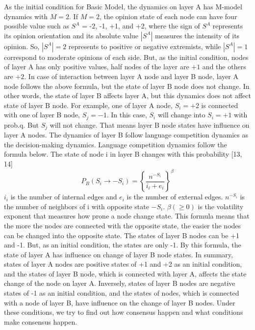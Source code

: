 \documentclass[english]{cccconf}
\begin{document}
As the initial condition for Basic Model, the dynamics on layer A has M-model dynamics with $M = 2$. If $M = 2$, the opinion state of each node can have four possible value such as $S^A$ = -2, -1, +1, and +2, where the sign of $S^A$ represents its opinion orientation and its absolute value $|S^A|$ measures the intensity of its opinion. So, $|S^A|=2$ represents to positive or negative extremists, while  $|S^A|=1$ correspond to moderate opinions of each side. But, as the initial condition, nodes of layer A has only positive values, half nodes of the layer are $+1$ and the others are $+2$. In case of interaction between layer A node and layer B node, layer A node follows the above formula, but the state of layer B node does not change. In other words, the state of layer B affects layer A, but this dynamics does not affect state of layer B node. For example, one of layer A node, $S_i = +2$ is connected with one of layer B node, $S_j = -1$. In this case, $S_i$ will change into $S_i = +1$ with prob.q. But $S_j$ will not change. That means layer B node states have influence on layer A nodes.
The dynamics of layer B follow language competition dynamics as the decision-making dynamics. Language competition dynamics follow the formula below. The state of node i in layer B changes with this probability [13, 14]
\begin{equation}
P_B(S_i \rightarrow -S_i)= \left \{\frac{n^{-S_i}}{i_i + e_i}\right \}^\beta
\end{equation}
$i_i$ is the number of internal edges and $e_i$ is the number of external edges. $n^{-S_i}$ is the number of neighbors of i with opposite state $-S_i$. $\beta(\geq 0)$ is the volatility exponent that measures how prone a node change state. This formula means that the more the nodes are connected with the opposite state, the easier the nodes can be changed into the opposite state.
The states of layer B nodes can be +1 and -1. But, as an initial condition, the states are only -1. By this formula, the state of layer A has influence on change of layer B node states.
In summary, states of layer A nodes are positive states of +1 and +2 as an initial condition, and the states of layer B node, which is connected with layer A, affects the state change of the node on layer A. Inversely, states of layer B nodes are negative states of -1 as an initial condition, and the states of nodes, which is connected with a node of layer B, have influence on the change of layer B nodes. Under these conditions, we try to find out how consensus happen and what conditions make consensus happen.\\
\end{document}
